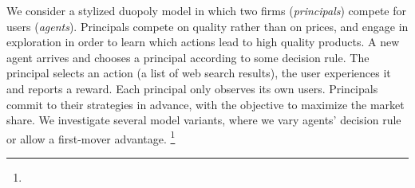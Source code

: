 






 We consider a stylized duopoly model in which two firms (\emph{principals}) compete for users (\emph{agents}). Principals compete on quality rather than on prices, and engage in exploration in order to learn which actions lead to high quality products. A new agent arrives and chooses a principal according to some decision rule. The principal selects an action (\eg a list of web search results), the user experiences it and reports a reward. Each principal only observes its own users. Principals commit to their strategies in advance, with the objective to maximize the market share. We investigate several model variants, %
where we vary agents' decision rule or allow a first-mover advantage.%
\footnote{}



